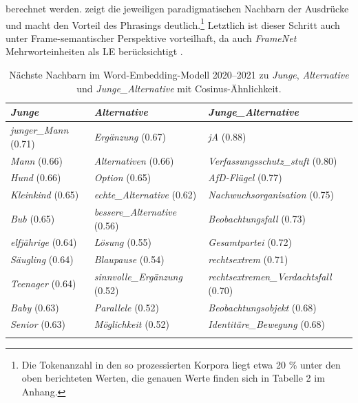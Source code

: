 berechnet werden.  zeigt die jeweiligen paradigmatischen Nachbarn der Ausdrücke und macht den Vorteil des Phrasings deutlich.\footnote{Die Tokenanzahl in den so prozessierten Korpora liegt etwa 20 \% unter den oben berichteten Werten, die genauen Werte finden sich in Tabelle 2 im Anhang.} Letztlich ist dieser Schritt auch unter Frame-semantischer Perspektive vorteilhaft, da auch \emph{FrameNet} Mehrworteinheiten als LE berücksichtigt \autocite[10]{ruppenhoferFrameNetIIExtended2016}.


\begin{table}
  \caption{Nächste Nachbarn im Word-Embedding-Modell 2020--2021 zu \emph{Junge}, \emph{Alternative} und \emph{Junge\_Alternative} mit Cosinus-Ähnlichkeit.}
  \label{tab:phrasing}
   \begin{tabularx}{\textwidth}{llX}
    \lsptoprule
              \emph{Junge}                    & \emph{Alternative}             & \emph{Junge\_Alternative} \\ %
    \midrule
    \emph{junger\_Mann} (0.71)      & \emph{Ergänzung} (0.67)        & \emph{jA} (0.88)          \\
    \emph{Mann} (0.66)              & \emph{Alternativen} (0.66)     & \emph{Verfassungsschutz\_stuft} (0.80) \\
    \emph{Hund} (0.66)              & \emph{Option} (0.65)           & \emph{AfD-Flügel} (0.77)  \\
    \emph{Kleinkind} (0.65)         & \emph{echte\_Alternative} (0.62) & \emph{Nachwuchsorganisation} (0.75) \\
    \emph{Bub} (0.65)               & \emph{bessere\_Alternative} (0.56) & \emph{Beobachtungsfall} (0.73) \\
    \emph{elfjährige} (0.64)        & \emph{Lösung} (0.55)           & \emph{Gesamtpartei} (0.72) \\
    \emph{Säugling} (0.64)          & \emph{Blaupause} (0.54)        & \emph{rechtsextrem} (0.71) \\
    \emph{Teenager} (0.64)          & \emph{sinnvolle\_Ergänzung} (0.52) & \emph{rechtsextremen\_Verdachtsfall} (0.70) \\
    \emph{Baby} (0.63)              & \emph{Parallele} (0.52)        & \emph{Beobachtungsobjekt} (0.68) \\
    \emph{Senior} (0.63)            & \emph{Möglichkeit} (0.52)      & \emph{Identitäre\_Bewegung} (0.68) \\
    \lspbottomrule
   \end{tabularx}
  \end{table}

